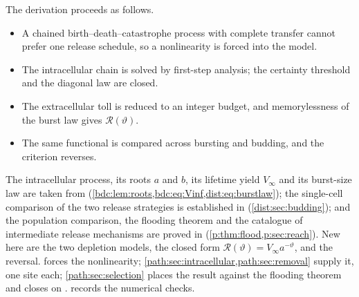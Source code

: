 The derivation proceeds as follows.
\begin{itemize}[leftmargin=1.6em,itemsep=0.25em,topsep=0.35em]
\item A chained birth--death--catastrophe process with complete transfer
cannot prefer one release schedule, so a nonlinearity is forced into the
model.
\item The intracellular chain is solved by first-step analysis; the
certainty threshold and the diagonal law are closed.
\item The extracellular toll is reduced to an integer budget, and
memorylessness of the burst law gives $\mathcal{R}(\vartheta)$.
\item The same functional is compared across bursting and budding, and the
criterion reverses.
\end{itemize}

The intracellular process, its roots $a$ and $b$, its lifetime yield
$V_\infty$ and its burst-size law are taken from \ChCore{}
(\cref{bdc:lem:roots,bdc:eq:Vinf,dist:eq:burstlaw}); the single-cell
comparison of the two release strategies is established in \ChDist{}
(\cref{dist:sec:budding}); and the population comparison, the flooding
theorem and the catalogue of intermediate release mechanisms are proved in
\ChPop{} (\cref{p:thm:flood,p:sec:reach}). New here are the two depletion
models, the closed form $\mathcal{R}(\vartheta)=V_\infty a^{-\vartheta}$,
and the reversal.  forces the nonlinearity;
\cref{path:sec:intracellular,path:sec:removal} supply it, one site each;
\cref{path:sec:selection} places the result against the flooding theorem and
closes on \yp{}.  records the numerical checks.

